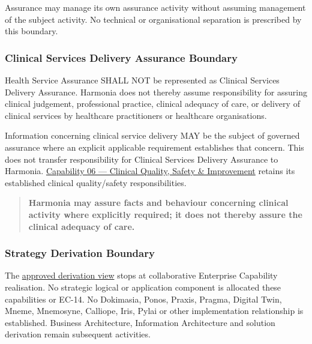 Assurance may manage its own assurance activity without assuming management of the subject activity. No technical or organisational separation is prescribed by this boundary.

\label{rad:enabling:763}
\subsubsection*{Clinical Services Delivery Assurance Boundary}
\label{rad:enabling:765}

Health Service Assurance SHALL NOT be represented as Clinical Services Delivery Assurance. Harmonia does not thereby assume responsibility for assuring clinical judgement, professional practice, clinical adequacy of care, or delivery of clinical services by healthcare practitioners or healthcare organisations.

\label{rad:enabling:767}

Information concerning clinical service delivery MAY be the subject of governed assurance where an explicit applicable requirement establishes that concern. This does not transfer responsibility for Clinical Services Delivery Assurance to Harmonia. \hyperref[rad:business:522]{Capability 06 — Clinical Quality, Safety \& Improvement} retains its established clinical quality/\allowbreak{}safety responsibilities.

\label{rad:enabling:769}

\begin{quote}

\textbf{Harmonia may assure facts and behaviour concerning clinical activity where explicitly required; it does not thereby assure the clinical adequacy of care.}


\end{quote}
\label{rad:enabling:771}
\subsubsection*{Strategy Derivation Boundary}
\label{rad:enabling:773}

The \hyperref[rad:assurance-strategy:88]{approved derivation view} stops at collaborative Enterprise Capability realisation. No strategic logical or application component is allocated these capabilities or EC-14. No Dokimasia, Ponos, Praxis, Pragma, Digital Twin, Mneme, Mnemosyne, Calliope, Iris, Pylai or other implementation relationship is established. Business Architecture, Information Architecture and solution derivation remain subsequent activities.

